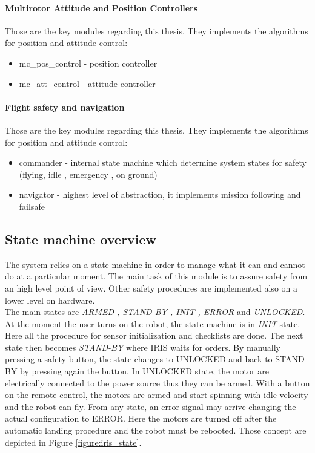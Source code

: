 \paragraph{Multirotor Attitude and Position Controllers} Those are the key modules regarding this thesis. They implements the algorithms for position and attitude control:
\begin{itemize}
	\item mc\_pos\_control - position controller
	\item mc\_att\_control - attitude controller
\end{itemize}

\paragraph{Flight safety and navigation} Those are the key modules regarding this thesis. They implements the algorithms for position and attitude control:
\begin{itemize}
	\item commander - internal state machine which determine system states for safety (flying, idle , emergency , on ground)
	\item navigator - highest level of abstraction, it implements mission following and failsafe
\end{itemize}

\subsection{State machine overview}

The system relies on a state machine in order to manage what it can and cannot do at a particular moment. The main task of this module is to assure safety from an high level point of view. Other safety procedures are implemented also on a lower level on hardware. \\

\noindent
The main states are \textit{ARMED , STAND-BY , INIT , ERROR} and \textit{UNLOCKED}. At the moment the user turns on the robot, the state machine is in \textit{INIT} state. Here all the procedure for sensor initialization and checklists are done. The next state then becomes \textit{STAND-BY} where IRIS waits for orders. By manually pressing a safety button, the state changes to UNLOCKED and back to STAND-BY by pressing again the button. In UNLOCKED state, the motor are electrically connected to the power source thus they can be armed. With a button on the remote control, the motors are armed and start spinning with idle velocity and the robot can fly. From any state, an error signal may arrive changing the actual configuration to ERROR. Here the motors are turned off after the automatic landing procedure and the robot must be rebooted. Those concept are depicted in Figure \ref{figure:iris_state}.

